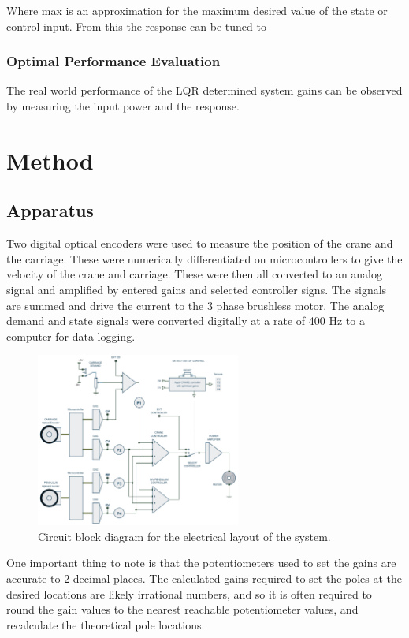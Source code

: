 \documentclass{article}
\begin{document}
Where max is an approximation for the maximum desired value of the state or control input.
From this the response can be tuned to 

\subsubsection{Optimal Performance Evaluation}

The real world performance of the LQR determined system gains can be observed by measuring the input power and the response.

\section{Method}

\subsection{Apparatus}

Two digital optical encoders were used to measure the position of the crane and the carriage.
These were numerically differentiated on microcontrollers to give the velocity of the crane and carriage.
These were then all converted to an analog signal and amplified by entered gains and selected controller signs.
The signals are summed and drive the current to the 3 phase brushless motor. 
The analog demand and state signals were converted digitally at a rate of 400 Hz to a computer for data logging. 

\begin{figure}[H]
  \centering
  \includegraphics[width=0.6\textwidth]{figures/electrical_layout.png}
  \caption{Circuit block diagram for the electrical layout of the system.}
  \label{fig:electrical_layout}
\end{figure}

One important thing to note is that the potentiometers used to set the gains are accurate to 2 decimal places.
The calculated gains required to set the poles at the desired locations are likely irrational numbers, and so
it is often required to round the gain values to the nearest reachable potentiometer values, and recalculate 
the theoretical pole locations.
\end{document}
